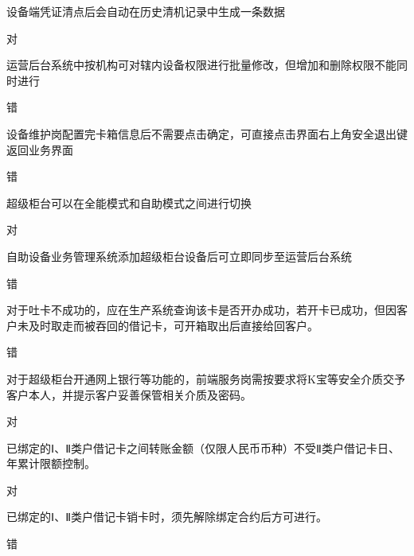 \documentclass[kindlepaper]{BHCexam4kindle}
\begin{document}
\begin{questions}
\qs 设备端凭证清点后会自动在历史清机记录中生成一条数据 \xx
\begin{solution} 对 \end{solution}
\qs 运营后台系统中按机构可对辖内设备权限进行批量修改，但增加和删除权限不能同时进行 \xx
\begin{solution} 错 \end{solution}
\qs 设备维护岗配置完卡箱信息后不需要点击确定，可直接点击界面右上角安全退出键返回业务界面 \xx
\begin{solution} 错 \end{solution}
\qs 超级柜台可以在全能模式和自助模式之间进行切换 \xx
\begin{solution} 对 \end{solution}
\qs 自助设备业务管理系统添加超级柜台设备后可立即同步至运营后台系统 \xx
\begin{solution} 错 \end{solution}
\qs 对于吐卡不成功的，应在生产系统查询该卡是否开办成功，若开卡已成功，但因客户未及时取走而被吞回的借记卡，可开箱取出后直接给回客户。 \xx
\begin{solution} 错 \end{solution}
\qs 对于超级柜台开通网上银行等功能的，前端服务岗需按要求将K宝等安全介质交予客户本人，并提示客户妥善保管相关介质及密码。 \xx
\begin{solution} 对 \end{solution}
\qs 已绑定的Ⅰ、Ⅱ类户借记卡之间转账金额（仅限人民币币种）不受Ⅱ类户借记卡日、年累计限额控制。 \xx
\begin{solution} 对 \end{solution}
\qs 已绑定的Ⅰ、Ⅱ类户借记卡销卡时，须先解除绑定合约后方可进行。 \xx
\begin{solution} 错 \end{solution}

\end{questions}
\end{document}
